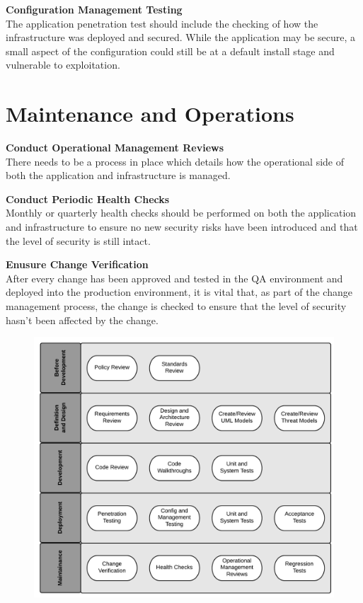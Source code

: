 		{\bf Configuration Management Testing} \\
		The application penetration test should include the checking of how the infrastructure was 
		deployed and secured. While the application may be secure, a small aspect of the configuration 
		could still be at a default install stage and vulnerable to exploitation.


	\section{Maintenance and Operations}
		{\bf Conduct Operational Management Reviews} \\
			There needs to be a process in place which details how the operational side of both the 
			application and infrastructure is managed.

		{\bf Conduct Periodic Health Checks} \\
			Monthly or quarterly health checks should be performed on both the application and 
			infrastructure to ensure no new security risks have been introduced and that the level 
			of security is still intact.

		{\bf Enusure Change Verification} \\
			After every change has been approved and tested in the QA environment and deployed into 
			the production environment, it is vital that, as part of the change management process, 
			the change is checked to ensure that the level of security hasn’t been affected by the change.

	\clearpage

	\begin{figure}[H]
		\includegraphics[width=\textwidth]{pics/testingFramework.png}
	\end{figure}

